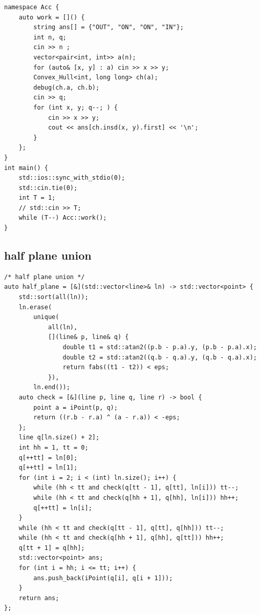\documentclass[UTF8, a4paper, titlepage, twoside]{ctexart}
\begin{document}
\begin{lstlisting}[style=cpp]
namespace Acc {
    auto work = []() {
        string ans[] = {"OUT", "ON", "ON", "IN"};
        int n, q;
        cin >> n ;
        vector<pair<int, int>> a(n);
        for (auto& [x, y] : a) cin >> x >> y;
        Convex_Hull<int, long long> ch(a);
        debug(ch.a, ch.b);
        cin >> q;
        for (int x, y; q--; ) {
            cin >> x >> y;
            cout << ans[ch.insd(x, y).first] << '\n';
        }
    };
}
int main() {
    std::ios::sync_with_stdio(0);
    std::cin.tie(0);
    int T = 1;
    // std::cin >> T;
    while (T--) Acc::work();
}
\end{lstlisting}

\subsection{ half plane union }
\begin{lstlisting}[style=cpp]
/* half plane union */
auto half_plane = [&](std::vector<line>& ln) -> std::vector<point> {
    std::sort(all(ln));
    ln.erase(
        unique(
            all(ln),
            [](line& p, line& q) {
                double t1 = std::atan2((p.b - p.a).y, (p.b - p.a).x);
                double t2 = std::atan2((q.b - q.a).y, (q.b - q.a).x);
                return fabs((t1 - t2)) < eps;
            }),
        ln.end());
    auto check = [&](line p, line q, line r) -> bool {
        point a = iPoint(p, q);
        return ((r.b - r.a) ^ (a - r.a)) < -eps;
    };
    line q[ln.size() + 2];
    int hh = 1, tt = 0;
    q[++tt] = ln[0];
    q[++tt] = ln[1];
    for (int i = 2; i < (int) ln.size(); i++) {
        while (hh < tt and check(q[tt - 1], q[tt], ln[i])) tt--;
        while (hh < tt and check(q[hh + 1], q[hh], ln[i])) hh++;
        q[++tt] = ln[i];
    }
    while (hh < tt and check(q[tt - 1], q[tt], q[hh])) tt--;
    while (hh < tt and check(q[hh + 1], q[hh], q[tt])) hh++;
    q[tt + 1] = q[hh];
    std::vector<point> ans;
    for (int i = hh; i <= tt; i++) {
        ans.push_back(iPoint(q[i], q[i + 1]));
    }
    return ans;
};
\end{lstlisting}
\end{document}

